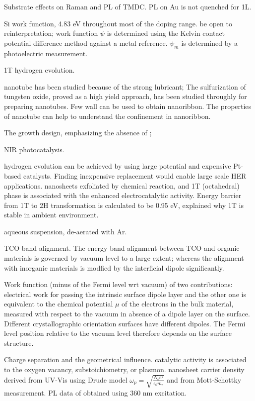 Substrate effects on Raman and PL of TMDC.\cite{Buscema2014}  PL on Au is not quenched for 1L. 

Si work function, 4.83 eV throughout most of the doping range.\cite{Allen1962} be open to reinterpretation; work function $\psi$ is determined using the Kelvin contact potential difference method against a metal reference. $\psi_m$ is determined by a photoelectric measurement. 

1T  hydrogen evolution.\cite{Voiry2013a}

 nanotube has been studied because of the strong lubricant;  
The sulfurization of tungsten oxide, proved as a high yield approach, has been studied throughly for preparing  nanotubes. Few wall  can be used to obtain nanoribbon. The properties of  nanotube can help to understand the confinement in  nanoribbon.

The growth design, emphasizing the absence of ; 

 NIR photocatalysis.\cite{Sang2014}


 hydrogen evolution can be achieved by using large potential and expensive Pt-based catalysts. Finding inexpensive replacement would enable large scale HER applications.\cite{Voiry2013a}  nanosheets exfoliated by chemical reaction, and 1T (octahedral) phase is associated with the enhanced electrocatalytic activity. Energy barrier from 1T to 2H transformation is calculated to be 0.95 eV, explained why 1T is stable in ambient environment. 

aqueous suspension, de-aerated with Ar. 

TCO band alignment.\cite{Klein2010} The energy band alignment between TCO and organic materials is governed by vacuum level to a large extent; whereas the alignment with inorganic materials is modfied by the interficial dipole significantly. 

Work function (minus of the Fermi level wrt vacuum) of two contributions: electrical work for passing the intrinsic surface dipole layer and the other one is equivalent to the chemical potential $\mu$ of the electrons in the bulk material, measured with respect to the vacuum in absence of a dipole layer on the surface.\cite{Gerischer1983} Different crystallographic orientation surfaces have different dipoles. The Fermi level position relative to the vacuum level therefore depends on the surface structure. 
 
Charge separation and the geometrical influence. catalytic activity is associated to the oxygen vacancy, substoichiometry, or plasmon.  nanosheet carrier density derived from UV-Vis using Drude model $\omega_p = \sqrt{\frac{N_e e^2}{\epsilon_0 m_e}}$ and from Mott-Schottky measurement. PL data of  obtained using 360 nm excitation.\cite{Yan2015}

